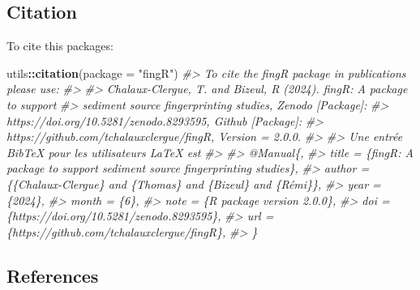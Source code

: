 \documentclass[
]{article}
\newenvironment{Shaded}{\begin{snugshade}}{\end{snugshade}}
\newcommand{\AttributeTok}[1]{\textcolor[rgb]{0.13,0.29,0.53}{#1}}
\newcommand{\CommentTok}[1]{\textcolor[rgb]{0.56,0.35,0.01}{\textit{#1}}}
\newcommand{\FunctionTok}[1]{\textcolor[rgb]{0.13,0.29,0.53}{\textbf{#1}}}
\newcommand{\NormalTok}[1]{#1}
\newcommand{\SpecialCharTok}[1]{\textcolor[rgb]{0.81,0.36,0.00}{\textbf{#1}}}
\newcommand{\StringTok}[1]{\textcolor[rgb]{0.31,0.60,0.02}{#1}}
\begin{document}
\hypertarget{citation}{%
\subsection{Citation}\label{citation}}

To cite this packages:

\begin{Shaded}
\begin{Highlighting}[]
\NormalTok{utils}\SpecialCharTok{::}\FunctionTok{citation}\NormalTok{(}\AttributeTok{package =} \StringTok{"fingR"}\NormalTok{)}
\CommentTok{\#\textgreater{} To cite the \textquotesingle{}fingR\textquotesingle{} package in publications please use:}
\CommentTok{\#\textgreater{} }
\CommentTok{\#\textgreater{}   Chalaux{-}Clergue, T. and Bizeul, R (2024). fingR: A package to support}
\CommentTok{\#\textgreater{}   sediment source fingerprinting studies, Zenodo [Package]:}
\CommentTok{\#\textgreater{}   https://doi.org/10.5281/zenodo.8293595, Github [Package]:}
\CommentTok{\#\textgreater{}   https://github.com/tchalauxclergue/fingR, Version = 2.0.0.}
\CommentTok{\#\textgreater{} }
\CommentTok{\#\textgreater{} Une entrée BibTeX pour les utilisateurs LaTeX est}
\CommentTok{\#\textgreater{} }
\CommentTok{\#\textgreater{}   @Manual\{,}
\CommentTok{\#\textgreater{}     title = \{fingR: A package to support sediment source fingerprinting studies\},}
\CommentTok{\#\textgreater{}     author = \{\{Chalaux{-}Clergue\} and \{Thomas\} and \{Bizeul\} and \{Rémi\}\},}
\CommentTok{\#\textgreater{}     year = \{2024\},}
\CommentTok{\#\textgreater{}     month = \{6\},}
\CommentTok{\#\textgreater{}     note = \{R package version 2.0.0\},}
\CommentTok{\#\textgreater{}     doi = \{https://doi.org/10.5281/zenodo.8293595\},}
\CommentTok{\#\textgreater{}     url = \{https://github.com/tchalauxclergue/fingR\},}
\CommentTok{\#\textgreater{}   \}}
\end{Highlighting}
\end{Shaded}

\hypertarget{references}{%
\subsection{References}\label{references}}
\end{document}
